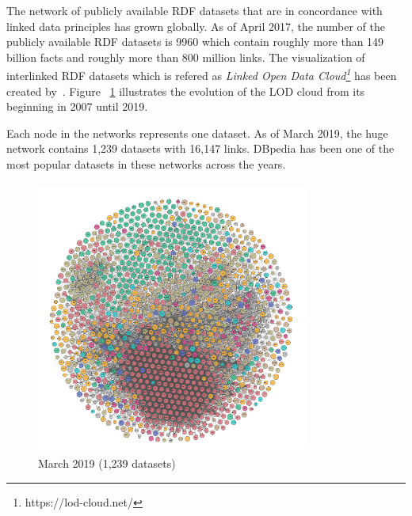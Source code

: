 The network of publicly available RDF datasets that are in concordance with linked data principles has grown globally. As of April 2017, the number of the publicly available RDF datasets is 9960 which contain roughly more than 149 billion facts and roughly more than 800 million links. The visualization of interlinked RDF datasets which is refered as \textit{Linked Open Data Cloud\footnote{https://lod-cloud.net/}} has been  created by~\cite{LOD_cloud}.  Figure ~\ref{fig:lod_cloud} illustrates the evolution of the LOD cloud from its beginning in 2007 until 2019.  

Each node in the networks represents one dataset. As of March 2019, the huge network contains 1,239 datasets with 16,147 links. DBpedia has been one of the most popular datasets in these networks across the years. 
\newpage

\vspace{10cm}

%
\clearpage

\begin{figure}[t!]
\centering
 \includegraphics[height=9cm,width=9cm]{Figures/fig_LOD_2019_clean.png}
 \caption{March 2019 (1,239 datasets)}
 \label{fig:lod_cloud}
\end{figure}


